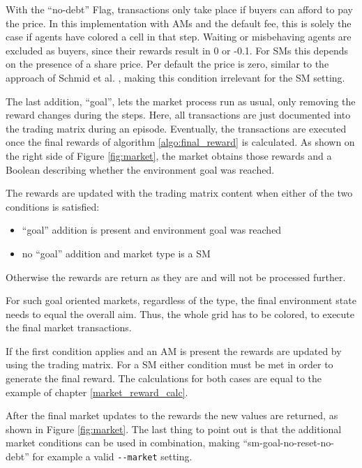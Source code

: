 With the ``no-debt'' Flag, transactions only take place if buyers can afford to pay the price. In this implementation with AMs and the default fee, this is solely the case if agents have colored a cell in that step. Waiting or misbehaving agents are excluded as buyers, since their rewards result in 0 or -0.1. For SMs this depends on the presence of a share price. Per default the price is zero, similar to the approach of Schmid et al. \cite{scbe21}, making this condition irrelevant for the SM setting.

The last addition, ``goal'', lets the market process run as usual, only removing the reward changes during the steps. Here, all transactions are just documented into the trading matrix during an episode. Eventually, the transactions are executed once the final rewards of algorithm \ref{algo:final_reward} is calculated. As shown on the right side of Figure \ref{fig:market}, the market obtains those rewards and a Boolean describing whether the environment goal was reached.

The rewards are updated with the trading matrix content when either of the two conditions is satisfied:
\begin{itemize}
    \item ``goal'' addition is present and environment goal was reached
    \item no ``goal'' addition and market type is a SM
\end{itemize}
Otherwise the rewards are return as they are and will not be processed further. 

For such goal oriented markets, regardless of the type, the final environment state needs to equal the overall aim. Thus, the whole grid has to be colored, to execute the final market transactions.


If the first condition applies and an AM is present the rewards are updated by using the trading matrix. For a SM either condition must be met in order to generate the final reward. The calculations for both cases are equal to the example of chapter \ref{market_reward_calc}.

After the final market updates to the rewards the new values are returned, as shown in Figure \ref{fig:market}. The last thing to point out is that the additional market conditions can be used in combination, making ``sm-goal-no-reset-no-debt'' for example a valid \verb|--market| setting.

